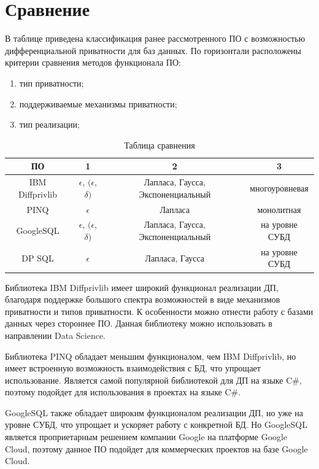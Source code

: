 \chapter{Сравнение}

В таблице приведена классификация ранее рассмотренного ПО с возможностью дифференциальной приватности для баз данных.
По горизонтали расположены критерии сравнения методов функционала ПО:

\begin{enumerate}
	\item тип приватности;
	\item поддерживаемые механизмы приватности;
	\item тип реализации;
\end{enumerate}

\begin{table}[h]
	\centering
	\begin{tabular}{|c|c|c|c|}
		\hline
		ПО & 1 & 2 & 3 \\ \hline
		IBM Diffprivlib & $\epsilon$, $(\epsilon$, $\delta)$  & \parbox{4.5cm}{Лапласа, Гаусса, Экспоненциальный} & многоуровневая  \\ \hline
		PINQ &  $\epsilon$ & Лапласа  & монолитная  \\ \hline
		GoogleSQL  & $\epsilon$, $(\epsilon$, $\delta)$ & \parbox{4.5cm}{Лапласа, Гаусса, Экспоненциальный}  & на уровне СУБД \\ \hline
		DP SQL  & $\epsilon$ & \parbox{4.5cm}{Лапласа, Гаусса}  & на уровне СУБД \\ \hline
	\end{tabular}
	\caption{Таблица сравнения}
\end{table}

Библиотека IBM Diffprivlib имеет широкий функционал реализации ДП, благодаря поддержке большого спектра возможностей в виде механизмов приватности и типов приватности.
К особенности можно отнести работу с базами данных через стороннее ПО.
Данная библиотеку можно использовать в направлении Data Science.

Библиотека PINQ обладает меньшим функционалом, чем IBM Diffprivlib, но имеет встроенную возможность взаимодействия с БД, что упрощает использование.
Является самой популярной библиотекой для ДП на языке C\#, поэтому подойдет для использования в проектах на языке C\#.

GoogleSQL также обладает широким функционалом реализации ДП, но уже на уровне СУБД, что упрощает и ускоряет работу с конкретной БД.
Но GoogleSQL является проприетарным решением компании Google на платформе Google Cloud, поэтому данное ПО подойдет для коммерческих проектов на базе Google Cloud.

